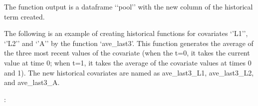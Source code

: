 \documentclass[letterpaper,10pt,english]{sphinxmanual}
\begin{document}
\sphinxAtStartPar
The function output is a dataframe ‘‘pool’’ with the new column of the historical term created.

\sphinxAtStartPar
The following is an example of creating historical functions for covariates ‘’L1’’, ‘’L2’’ and ‘’A’’ by the function
‘ave\_last3’. This function generates the average of the three most recent values of the covariate (when the
t=0, it takes the current value at time 0; when t=1, it takes the average of the covariate values at times 0 and 1).
The new historical covariates are named as ave\_last3\_L1, ave\_last3\_L2, and ave\_last3\_A.

\sphinxAtStartPar
{}:

\begin{sphinxVerbatim}[commandchars=\\\{\}]
     

      
         
            \PYG{p}{[}\PYG{p}{[}\PYG{p}{]}    \PYG{p}{[}\PYG{p}{]}  \PYG{p}{]}\PYG{p}{[}\PYG{p}{]}
            \PYG{p}{[}\PYG{p}{[}\PYG{p}{]}      \PYG{p}{[}\PYG{p}{]}  \PYG{p}{]}\PYG{p}{[}\PYG{p}{]}
       


\end{sphinxVerbatim}
\end{document}
